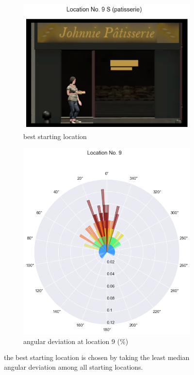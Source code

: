\begin{figure}[h!]
	\centering
	\begin{subfigure}[b]{0.48\linewidth}
		\includegraphics[width=\linewidth]{figures/best_loc_angular_error_withHA_23.png}
		\caption{best starting location}
		\label{fig:best_angular}
	\end{subfigure}
	\begin{subfigure}[b]{0.48\linewidth}
		\includegraphics[width=\linewidth]{figures/deviation_degrees_loc_nr_9_23.png}
		\caption{angular deviation at location 9 (\%)}
		\label{fig:best_angular_dist_9}
	\end{subfigure}
	
	\caption[Best starting location based on angular deviation]{the best starting location is chosen by taking the least median angular deviation among all starting locations.}
\end{figure}
\label{fig:best_location}

